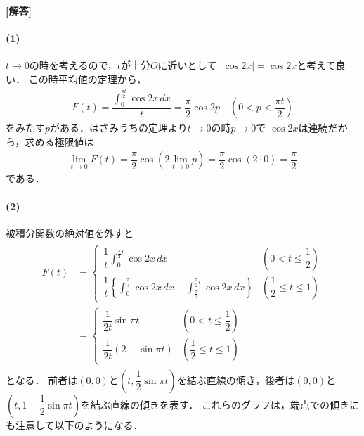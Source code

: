 \documentclass[../../main.tex]{subfiles}
\begin{document}
\begin{oframed}
  
\end{oframed}

{\bf [解答]}
\paragraph{(1)}

$t\to 0$の時を考えるので，$t$が十分$O$に近いとして $|\cos2x|=\cos2x$と考えて良い．
この時平均値の定理から，
\begin{align}
  F(t)=\dfrac{\displaystyle \int_0^{\frac{\pi t}{2}}\cos2x\,dx}{t}=\dfrac{\pi}{2}\cos2p \quad \left(0<p<\dfrac{\pi t}{2}\right)
\end{align}
をみたす$p$がある．はさみうちの定理より$t\to 0$の時$p\to 0$で $\cos2x$は連続だから，求める極限値は
\begin{align}
  \lim_{t\to 0} F(t) = \dfrac{\pi}{2}\cos(2\lim_{t\to 0} p )=\dfrac{\pi}{2} \cos(2\cdot 0) = \dfrac{\pi}{2}
\end{align}
である．

\paragraph{(2)}
被積分関数の絶対値を外すと
\begin{align}
  \begin{split}
    F(t)&=
    \begin{cases}\displaystyle
      \dfrac{1}{t}\displaystyle\int_0^{\frac{\pi}{2}t}\cos2x\,dx & \left(0<t\le\dfrac{1}{2}\right) \\[2mm]
      \dfrac{1}{t}\left\{\displaystyle\int_0^{\frac{\pi}{4}}\cos2x\,dx-\int_{\frac{\pi}{4}}^{\frac{\pi}{2}t}\cos2x\,dx\right\} & \left(\dfrac{1}{2}\le t\le1\right)
    \end{cases} \\
    &=
    \begin{cases}\displaystyle
      \dfrac{1}{2t}\sin\pi t & \left(0<t\le\dfrac{1}{2}\right) \\[2mm]
      \dfrac{1}{2t}(2-\sin\pi t) & \left(\dfrac{1}{2}\le t\le1\right)
    \end{cases}
  \end{split}
\end{align}
となる．
前者は$(0,0)$と$\left(t,\dfrac{1}{2}\sin\pi t\right)$を結ぶ直線の傾き，後者は$(0,0)$と$\left(t,1-\dfrac{1}{2}\sin\pi t\right)$を結ぶ直線の傾きを表す．
これらのグラフは，端点での傾きにも注意して以下のようになる．
\end{document}
